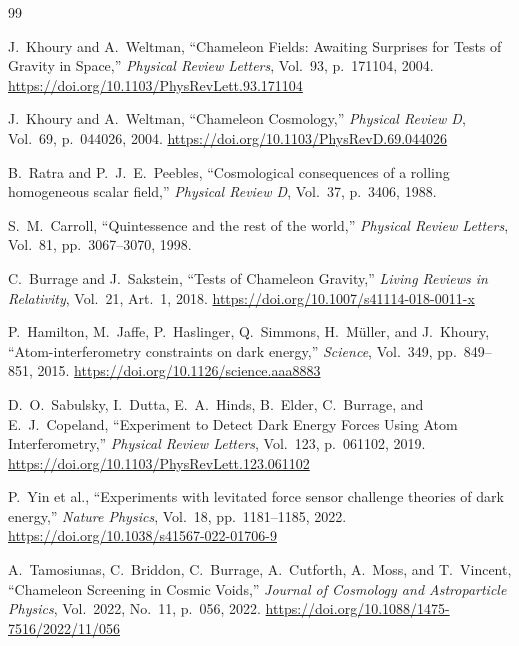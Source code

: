 \documentclass[11pt, a4paper]{article}
\begin{document}
\begin{thebibliography}{99}

J.~Khoury and A.~Weltman,
``Chameleon Fields: Awaiting Surprises for Tests of Gravity in Space,''
\textit{Physical Review Letters}, Vol.~93, p.~171104, 2004.
\href{https://doi.org/10.1103/PhysRevLett.93.171104}{https://doi.org/10.1103/PhysRevLett.93.171104}

J.~Khoury and A.~Weltman,
``Chameleon Cosmology,''
\textit{Physical Review D}, Vol.~69, p.~044026, 2004.
\href{https://doi.org/10.1103/PhysRevD.69.044026}{https://doi.org/10.1103/PhysRevD.69.044026}

B.~Ratra and P.~J.~E.~Peebles,
``Cosmological consequences of a rolling homogeneous scalar field,''
\textit{Physical Review D}, Vol.~37, p.~3406, 1988.

S.~M.~Carroll,
``Quintessence and the rest of the world,''
\textit{Physical Review Letters}, Vol.~81, pp.~3067--3070, 1998.

C.~Burrage and J.~Sakstein,
``Tests of Chameleon Gravity,''
\textit{Living Reviews in Relativity}, Vol.~21, Art.~1, 2018.
\href{https://doi.org/10.1007/s41114-018-0011-x}{https://doi.org/10.1007/s41114-018-0011-x}

P.~Hamilton, M.~Jaffe, P.~Haslinger, Q.~Simmons, H.~M\"uller, and J.~Khoury,
``Atom-interferometry constraints on dark energy,''
\textit{Science}, Vol.~349, pp.~849--851, 2015.
\href{https://doi.org/10.1126/science.aaa8883}{https://doi.org/10.1126/science.aaa8883}

D.~O.~Sabulsky, I.~Dutta, E.~A.~Hinds, B.~Elder, C.~Burrage, and E.~J.~Copeland,
``Experiment to Detect Dark Energy Forces Using Atom Interferometry,''
\textit{Physical Review Letters}, Vol.~123, p.~061102, 2019.
\href{https://doi.org/10.1103/PhysRevLett.123.061102}{https://doi.org/10.1103/PhysRevLett.123.061102}

P.~Yin et al.,
``Experiments with levitated force sensor challenge theories of dark energy,''
\textit{Nature Physics}, Vol.~18, pp.~1181--1185, 2022.
\href{https://doi.org/10.1038/s41567-022-01706-9}{https://doi.org/10.1038/s41567-022-01706-9}

A.~Tamosiunas, C.~Briddon, C.~Burrage, A.~Cutforth, A.~Moss, and T.~Vincent,
``Chameleon Screening in Cosmic Voids,''
\textit{Journal of Cosmology and Astroparticle Physics}, Vol.~2022, No.~11, p.~056, 2022.
\href{https://doi.org/10.1088/1475-7516/2022/11/056}{https://doi.org/10.1088/1475-7516/2022/11/056}

\end{thebibliography}
\end{document}
